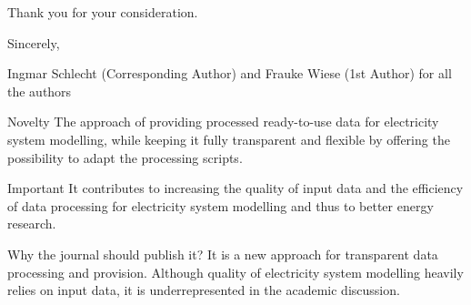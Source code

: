 Thank you for your consideration.

Sincerely,

Ingmar Schlecht (Corresponding Author) and Frauke Wiese (1st Author) for all the authors




Novelty
The approach of providing processed ready-to-use data for electricity system modelling, while keeping it fully transparent and flexible by offering the possibility to adapt the processing scripts.

Important
It contributes to increasing the quality of input data and the efficiency of data processing for electricity system modelling and thus to better energy research.

Why the journal should publish it?
It is a new approach for transparent data processing and provision. Although quality of electricity system modelling heavily relies on input data, it is underrepresented in the academic discussion.
